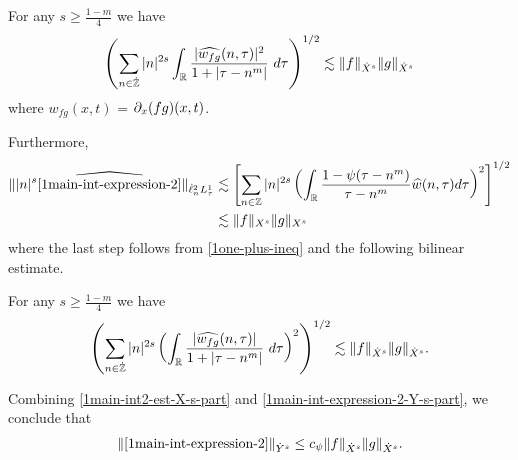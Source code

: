%
%
%
%
%
%
\begin{proposition}
	\label{1prop:prim-bilin-est}
	For any $s \ge \frac{1-m}{4}$ we have
	\begin{equation}
		\label{1prim-bilin-est}
		\left( \sum_{n \in \dot{\mathbb{Z}}} |n|^{2s} \int_{\mathbb{R}}
		\frac{|\widehat{w_{fg}}(n, \tau) |^2}{1+ |\tau - 
		n^m| } 
		 \ d \tau 
		\right)^{1/2}
		\lesssim \|f\|_{\dot{X}^s} \|g\|_{\dot{X}^s}
	\end{equation}
	where $w_{fg}(x,t)$ = $\partial_x(fg)(x,t)$.
\end{proposition}
Furthermore,
%
%
%
%
\begin{equation}
	\label{1main-int-expression-2-Y-s-part}
	\begin{split}
		\| | n |^{s} \widehat{\eqref{1main-int-expression-2}} \|_{\dot{\ell}^2_n L^1_\tau}
		& \lesssim 
		\left[ \sum_{n \in \mathbb{Z}}|n|^{2s} \left(
		\int_{\mathbb{R}}\frac{1 - \psi(\tau - n^m)}{\tau - n^m} \widehat{w}(n, \tau) d
		\tau \right)^{2} \right]^{1/2}
		\\
		& \lesssim \|f\|_{X^s} \|g\|_{X^s}
	\end{split}
\end{equation}
%
%
where the last step follows from \eqref{1one-plus-ineq} and
the following bilinear estimate.
%
%
%
%
%
%
%
\begin{proposition}
\label{1prop:bilinear-estimate2}
For any $s \ge \frac{1-m}{4}$ we have
%
%
\begin{equation}
	\label{1bilinear-estimate2}
	\begin{split}
		\left( \sum_{n \in \dot{\mathbb{Z}}} |n|^{2s}  \left ( \int_{\mathbb{R}} 
		\frac{|\widehat{w_{fg}}(n, \tau) |}{1 + | \tau - n^m |}
		 \ d\tau \right)^2  \right)^{1/2} \lesssim \|f\|_{\dot{X}^s} \|g\|_{\dot{X}^s}.
	\end{split}
\end{equation}
\end{proposition}
%
%
Combining \eqref{1main-int2-est-X-s-part} and
\eqref{1main-int-expression-2-Y-s-part}, we conclude that
%
%
%
%
\begin{equation}
	\label{1main-int2-est}
	\begin{split}
		\|\eqref{1main-int-expression-2}\|_{\dot{Y}^s} \le c_{\psi}\|f\|_{\dot{X}^s} \|g\|_{\dot{X}^s}.
	\end{split}
\end{equation}
%
%
